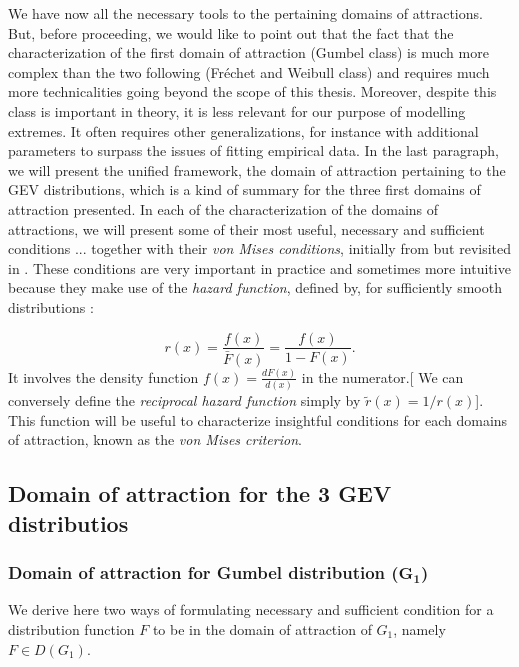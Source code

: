 \documentclass[11pt,a4paper,openany ]{book}
\begin{document}
We have now all the necessary tools to  the pertaining domains of attractions. But, before proceeding, we would like to point out that the fact that the characterization of the first domain of attraction (Gumbel class)  is much more complex than the two following (Fréchet and Weibull class) and requires much more technicalities going beyond the scope of this thesis. Moreover, despite this class is important in theory, it is less relevant for our purpose of modelling extremes. It often requires other generalizations, for instance with additional parameters to surpass the issues of fitting empirical data. \cite{pinheiro_comparative_2015}
In the last paragraph, we will present the unified framework, the domain of attraction pertaining to the GEV distributions, which is a kind of summary for the three first domains of attraction presented.
\newline
In each of the characterization of the domains of attractions, we will present some of their most useful, necessary and sufficient conditions ... together with their \emph{von Mises conditions}, initially from \cite{} but revisited in \cite{falk_vonmises_1994}. These conditions are very important in practice and sometimes more intuitive because they make use of the \emph{hazard function}, defined by, for sufficiently smooth distributions :

\begin{equation}\label{haz}
r(x)=\frac{f(x)}{\bar{F}(x)}= \frac{f(x)}{1-F(x)}.
\end{equation}
It involves the density function $f(x)=\frac{dF(x)}{d(x)}$ in the numerator.\cite{.??.}[ We 
can conversely define the \emph{reciprocal hazard function} simply by 
$\tilde{r}(x)=1/r(x)$].
This function will be useful to characterize insightful conditions for each domains of 
attraction, known as the\emph{ von Mises criterion}.

\subsection{Domain of attraction for the 3 GEV distributios}


\subsubsection*{Domain of attraction for Gumbel distribution ($\mathbf{G_1}$) }  We derive here two ways of formulating necessary and sufficient condition for a distribution function $F$ to be in the domain of attraction of $G_1$, namely $F\in D(G_1)$.
\end{document}
